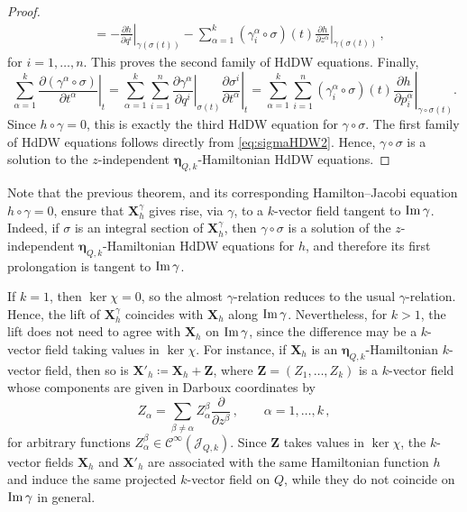 \documentclass[11pt,twoside]{article}
\theoremstyle{plain}
\theoremstyle{definition}
\theoremstyle{remark}
\newcommand{\Cinfty}{\mathscr{C}^\infty}
\newcommand\restr[2]{\left.#1\right|_{#2}} \newcommand{\bfX}{\mathbf{X}} \newcommand{\bfY}{\mathbf{Y}} \newcommand{\bfZ}{\mathbf{Z}} \newcommand{\qeddiamond}{\hfill $\diamond$} \newcommand{\parder}[2]{\frac{\partial #1}{\partial #2}} \newcommand{\dparder}[2]{\dfrac{\partial #1}{\partial #2}} \newcommand{\tparder}[2]{\partial #1/\partial #2} \newcommand{\parderr}[3]{\frac{\partial^2 #1}{\partial #2\partial #3}} \newcommand{\dparderr}[3]{\dfrac{\partial^2 #1}{\partial #2\partial #3}} \newcommand{\tparderr}[3]{\partial^2 #1/\partial #2\partial #3}
\begin{document}
\begin{proof}
\begin{align}
&=
- \restr{\frac{\partial h}{\partial q^i}}{\gamma(\sigma(t))}
- \sum_{\alpha=1}^k (\gamma_i^\alpha\circ \sigma)(t)\restr{\frac{\partial h}{\partial z^\alpha}}{\gamma(\sigma(t))}\,,
\end{align}
for $i=1,\dotsc,n$.  This proves the second family of HdDW equations. Finally,
\[
\sum_{\alpha=1}^k \restr{\frac{\partial (\gamma^\alpha \circ \sigma)}{\partial t^\alpha}}{t}
=
\sum_{\alpha=1}^k\sum_{i=1}^n \restr{\frac{\partial \gamma^\alpha}{\partial q^i}}{\sigma(t)} \restr{\frac{\partial \sigma^i}{\partial t^\alpha}}{t}
=
\sum_{\alpha=1}^k\sum_{i=1}^n (\gamma_i^\alpha \circ \sigma)(t)\restr{\frac{\partial h}{\partial p_i^\alpha}}{\gamma\circ\sigma(t)}.
\]
Since \(h\circ \gamma=0\), this is exactly the third HdDW equation for \(\gamma\circ \sigma\). The first family of HdDW equations follows directly from \eqref{eq:sigmaHDW2}. Hence, \(\gamma\circ \sigma\) is a solution to the $z$-independent $\bm\eta_{Q,k}$-Hamiltonian HdDW equations. 
\end{proof}

 
Note that the previous theorem, and its corresponding Hamilton--Jacobi equation \(h\circ\gamma=0\), ensure that \(\mathbf X_h^\gamma\) gives rise, via \(\gamma\), to a \(k\)-vector field tangent to \({\rm Im}\,\gamma\). Indeed, if \(\sigma\) is an integral section of \(\mathbf X_h^\gamma\), then \(\gamma\circ\sigma\) is a solution of the $z$-independent $\bm\eta_{Q,k}$-Hamiltonian HdDW equations for \(h\), and therefore its first prolongation is tangent to \({\rm Im}\,\gamma\).

If \(k=1\), then \(\ker\chi=0\), so the almost \(\gamma\)-relation reduces to the usual \(\gamma\)-relation. Hence, the lift of \(\mathbf X_h^\gamma\) coincides with \(\mathbf X_h\) along \({\rm Im}\,\gamma\). Nevertheless, for \(k>1\), the lift does not need to agree with \(\mathbf X_h\) on \({\rm Im}\,\gamma\), since the difference may be a \(k\)-vector field taking values in \(\ker\chi\). For instance, if \(\mathbf X_h\) is an \({\bm \eta}_{Q,k}\)-Hamiltonian \(k\)-vector field, then so is \(\mathbf X'_h\coloneqq\mathbf X_h+\mathbf Z\), where \(\mathbf Z=(Z_1,\dots,Z_k)\) is a \(k\)-vector field whose components are given in Darboux coordinates by
\[
Z_\alpha=\sum_{\beta\neq \alpha}Z_{\alpha}^\beta\frac{\partial}{\partial z^\beta}\,,\qquad \alpha=1,\dots,k\,,
\]
for arbitrary functions \(Z_\alpha^\beta\in \Cinfty(\mathcal J_{Q,k})\). Since \(\mathbf Z\) takes values in \(\ker\chi\), the \(k\)-vector fields \(\mathbf X_h\) and \(\mathbf X'_h\) are associated with the same Hamiltonian function \(h\) and induce the same projected \(k\)-vector field on \(Q\), while they do not coincide on \({\rm Im}\,\gamma\) in general.
\end{document}
